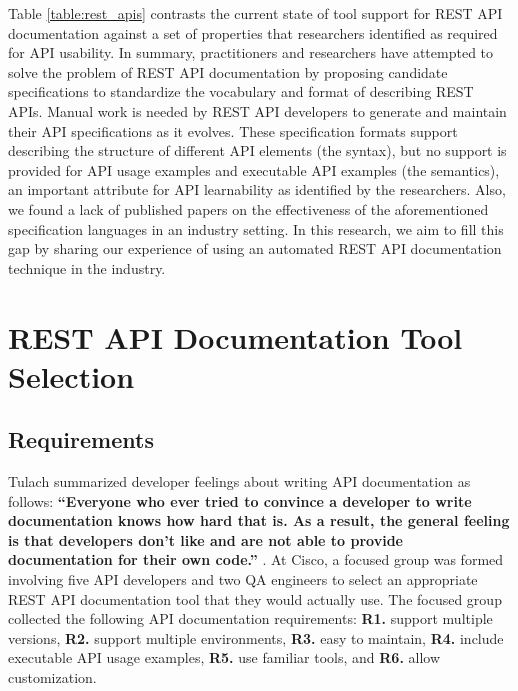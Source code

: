 \documentclass[10pt, conference]{IEEEtran}
\begin{document}
Table \ref{table:rest_apis} contrasts the current state of tool support for REST API documentation against a set of properties that researchers identified as required for API usability. In summary, practitioners and researchers have attempted to solve the problem of REST API documentation by proposing candidate specifications to standardize the vocabulary and format of describing REST APIs. Manual work is needed by REST API developers to generate and maintain their API specifications as it evolves. These specification formats support describing the structure of different API elements (the syntax), but no support is provided for API usage examples and executable API examples (the semantics), an important attribute for API learnability as identified by the researchers. Also, we found a lack of published papers on the effectiveness of the aforementioned specification languages in an industry setting. In this research, we aim to fill this gap by sharing our experience of using an automated REST API documentation technique in the industry.

\section{REST API Documentation Tool Selection}

\subsection{Requirements}

Tulach summarized developer feelings about writing API documentation as follows: \textbf{``Everyone who ever tried to convince a developer to write documentation knows how hard that is.
As a result, the general feeling is that developers don't like and are not able to provide documentation for their own code.''} \cite{Tulach2008}. At Cisco, a focused group was formed involving five API developers and two QA engineers to select an appropriate REST API documentation tool that they would actually use. The focused group collected the following API documentation requirements: \textbf{R1.} support multiple versions, \textbf{R2.} support multiple environments, \textbf{R3.} easy to maintain, \textbf{R4.} include executable API usage examples, \textbf{R5.} use familiar tools, and \textbf{R6.} allow customization.
\end{document}
